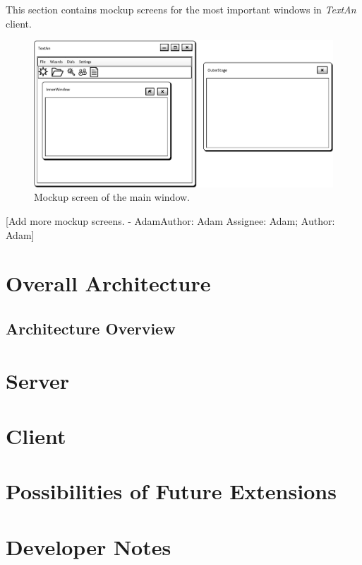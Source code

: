 \documentclass[12pt,a4paper]{report}
\makeatletter
\newcommand{\comment}[3][\@empty]{
  {\color{magenta}[#3 - }
  {\color{green}\ifx\@empty#1\relax Author: #2 \else Assignee: #1; Author: #2\fi}{\color{magenta}]}
}
\newcommand{\textan}{\emph{Text\-An}}
\makeatother
\begin{document}
This section contains mockup screens for the most important windows in \textan{}
client.

\begin{figure}[!htb]
        \centering
        \includegraphics[width=\textwidth]{Images/MockupMainWindow}
        \caption{Mockup screen of the main window.}
        \label{fig:MockupMainWindow}
\end{figure}

\comment[Adam]{Adam}{Add more mockup screens.}

\chapter{Overall Architecture}
\section{Architecture Overview}


\chapter{Server}


\chapter{Client}


%


\chapter{Possibilities of Future Extensions}


\chapter{Developer Notes}
\end{document}
